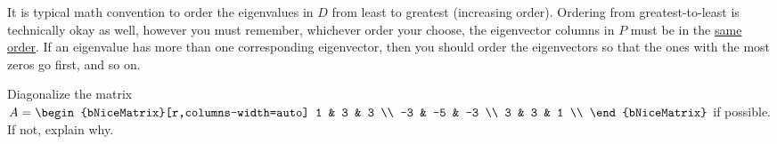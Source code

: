 \begin{note}
  \label{nte:ordering_eigenvalues}

  It is typical math convention to order the eigenvalues in $D$ from least to
  greatest (increasing order). Ordering from greatest-to-least is technically
  okay as well, however you must remember, whichever order your choose, the
  eigenvector columns in $P$ must be in the \underline{same order}. If an
  eigenvalue has more than one corresponding eigenvector, then you should order
  the eigenvectors so that the ones with the most zeros go first, and so on.
\end{note}

\begin{question}
  \label{qst:diagonalizing_matrices}

  Diagonalize the matrix $A =
  \begin{bNiceMatrix}[r,columns-width=auto]
    1 & 3 & 3 \\
    -3 & -5 & -3 \\
    3 & 3 & 1 \\
  \end{bNiceMatrix}$ if possible. If not, explain why.
\end{question}

